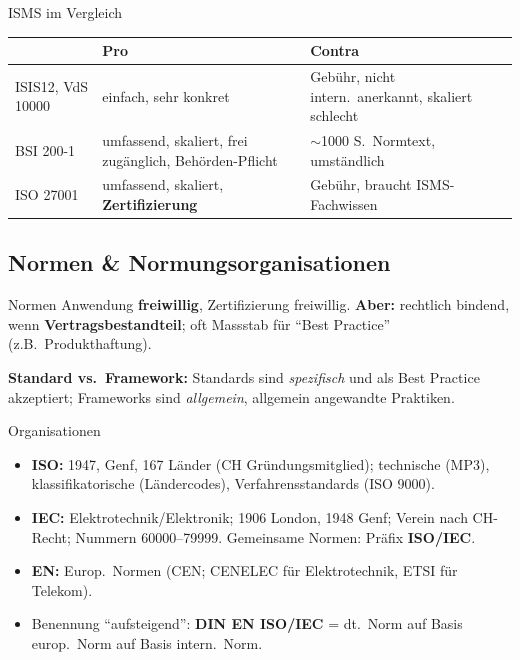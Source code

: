 \documentclass[a4paper, fontsize=7pt]{scrartcl}
\renewcommand*{\arraystretch}{1.5}  %
\begin{document}
\begin{mainbox}{ISMS im Vergleich}
\renewcommand*{\arraystretch}{1.2}
\begin{tabularx}{\linewidth}{@{}l|X|X@{}}
& \textbf{Pro} & \textbf{Contra} \\
\hline
ISIS12, VdS 10000 & einfach, sehr konkret & Gebühr, nicht intern.\ anerkannt,
skaliert schlecht \\
\hline
BSI 200-1 & umfassend, skaliert, frei zugänglich, Behörden-Pflicht &
$\sim$1000 S.\ Normtext, umständlich \\
\hline
ISO 27001 & umfassend, skaliert, \textbf{Zertifizierung} & Gebühr, braucht
ISMS-Fachwissen \\
\end{tabularx}
\end{mainbox}

\subsection{Normen \& Normungsorganisationen}

\begin{mainbox}{Normen}
Anwendung \textbf{freiwillig}, Zertifizierung freiwillig. \textbf{Aber:} rechtlich
bindend, wenn \textbf{Vertragsbestandteil}; oft Massstab für ``Best Practice''
(z.B.\ Produkthaftung).

\textbf{Standard vs.\ Framework:} Standards sind \emph{spezifisch} und als Best
Practice akzeptiert; Frameworks sind \emph{allgemein}, allgemein angewandte
Praktiken.
\end{mainbox}

\begin{mainbox}{Organisationen}
\begin{itemize}
    \item \textbf{ISO:} 1947, Genf, 167 Länder (CH Gründungsmitglied); technische
          (MP3), klassifikatorische (Ländercodes), Verfahrensstandards (ISO 9000).
    \item \textbf{IEC:} Elektrotechnik/Elektronik; 1906 London, 1948 Genf; Verein
          nach CH-Recht; Nummern 60000--79999. Gemeinsame Normen: Präfix
          \textbf{ISO/IEC}.
    \item \textbf{EN:} Europ.\ Normen (CEN; CENELEC für Elektrotechnik, ETSI für
          Telekom).
    \item Benennung ``aufsteigend'': \textbf{DIN EN ISO/IEC} = dt.\ Norm auf Basis
          europ.\ Norm auf Basis intern.\ Norm.
\end{itemize}
\end{mainbox}
\end{document}
